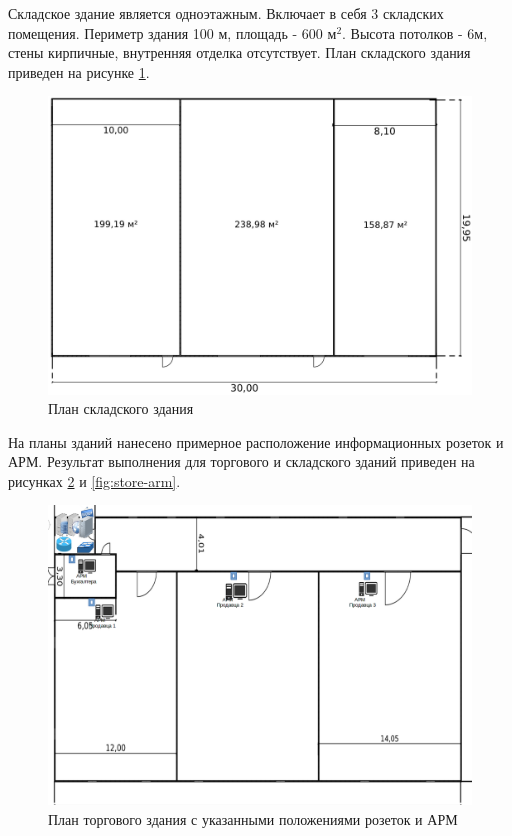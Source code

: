 Складское здание является одноэтажным. Включает в себя 3 складских помещения. Периметр здания 100 м, площадь \hyp{} 600 $\text{м}^2$. Высота потолков \hyp{} 6м, стены кирпичные, внутренняя отделка отсутствует. План складского здания приведен на рисунке \ref{fig:store-plane}.
\begin{figure}[H]
  \centering
  \includegraphics[width=\linewidth]{sec3/img/store-plane.png}
  \caption{План складского здания}
  \label{fig:store-plane}
\end{figure}

На планы зданий нанесено примерное расположение информационных розеток и АРМ. Результат выполнения для торгового и складского зданий приведен на рисунках \ref{fig:shop-arm} и \ref{fig:store-arm}.
\begin{figure}[H]
  \centering
  \includegraphics[width=\linewidth]{sec3/img/shop.png}
  \caption{План торгового здания с указанными положениями розеток и АРМ}
  \label{fig:shop-arm}
\end{figure}

